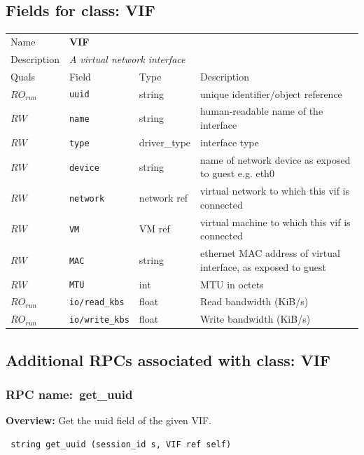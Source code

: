 \subsection{Fields for class: VIF}
\begin{longtable}{|lllp{}|}
\hline
\multicolumn{1}{|l}{Name} & \multicolumn{3}{l|}{\bf VIF} \\
\multicolumn{1}{|l}{Description} & \multicolumn{3}{l|}{\parbox{11cm}{\em A virtual network interface}} \\
\hline
Quals & Field & Type & Description \\
\hline
$\mathit{RO}_\mathit{run}$ &  {\tt uuid} & string & unique identifier/object reference \\
$\mathit{RW}$ &  {\tt name} & string & human-readable name of the interface \\
$\mathit{RW}$ &  {\tt type} & driver\_type & interface type \\
$\mathit{RW}$ &  {\tt device} & string & name of network device as exposed to guest e.g. eth0 \\
$\mathit{RW}$ &  {\tt network} & network ref & virtual network to which this vif is connected \\
$\mathit{RW}$ &  {\tt VM} & VM ref & virtual machine to which this vif is connected \\
$\mathit{RW}$ &  {\tt MAC} & string & ethernet MAC address of virtual interface, as exposed to guest \\
$\mathit{RW}$ &  {\tt MTU} & int & MTU in octets \\
$\mathit{RO}_\mathit{run}$ &  {\tt io/read\_kbs} & float & Read bandwidth (KiB/s) \\
$\mathit{RO}_\mathit{run}$ &  {\tt io/write\_kbs} & float & Write bandwidth (KiB/s) \\
\hline
\end{longtable}
\subsection{Additional RPCs associated with class: VIF}
\subsubsection{RPC name:~get\_uuid}

{\bf Overview:} 
Get the uuid field of the given VIF.

\begin{verbatim} string get_uuid (session_id s, VIF ref self)\end{verbatim}


